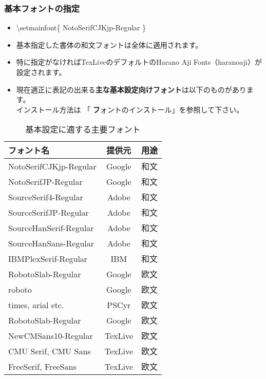 \documentclass[a4paper,10pt]{ltjsarticle}
\def\colH#1{\color[HTML]{#1}}
\def\bs{\textbackslash }
\def\basefont{NotoSerifCJKjp-Regular}
\begin{document}
\subsubsection{基本フォントの指定}
\begin{itemize}
  \item[]\hspace{-5mm} {\colH{800000}\bs setmainfont\{} \basefont{\colH{800000} \}}
  \item 基本指定した書体の和文フォントは全体に適用されます。
  \item 特に指定がなければTexLiveのデフォルトのHarano Aji Fonts（haranoaji）が設定されます。
  \item 現在適正に表記の出来る\textbf{主な基本設定向けフォント}は以下のものがあります。\\
  インストール方法は 「 {\textbf フォントのインストール}」を参照して下さい。\vspace{-4mm}
\end{itemize}
\begin{table}[h]
\begin{center}
\begin{tabular}{l|c|l}
\textbf{フォント名} & \textbf{提供元} & \textbf{用途}\\
\hline
NotoSerifCJKjp-Regular & Google & 和文\\%
NotoSerifJP-Regular & Google & 和文\\%
SourceSerif4-Regular & Adobe & 和文\\%
SourceSerifJP-Regular & Adobe & 和文\\%
SourceHanSerif-Regular & Adobe & 和文\\%
SourceHanSans-Regular & Adobe & 和文\\%
IBMPlexSerif-Regular & IBM & 和文\\%
RobotoSlab-Regular & Google & 欧文\\%
roboto & Google & 欧文\\%
times, arial etc. & PSCyr & 欧文\\%
RobotoSlab-Regular & Google & 欧文\\%
NewCMSans10-Regular & TexLive & 欧文\\%
CMU Serif, CMU Sans & TexLive & 欧文\\%
FreeSerif, FreeSans & TexLive & 欧文\\%
\end{tabular}
\caption{基本設定に適する主要フォント}\vspace{-8mm}
\end{center}
\end{table}
\end{document}
